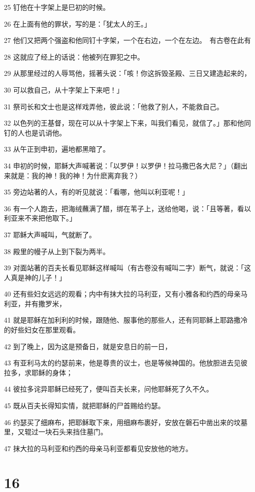 \par 25 钉他在十字架上是巳初的时候。
\par 26 在上面有他的罪状，写的是：「犹太人的王。」
\par 27 他们又把两个强盗和他同钉十字架，一个在右边，一个在左边。　有古卷在此有
\par 28 这就应了经上的话说：他被列在罪犯之中。
\par 29 从那里经过的人辱骂他，摇著头说：「咳！你这拆毁圣殿、三日又建造起来的，
\par 30 可以救自己，从十字架上下来吧！」
\par 31 祭司长和文士也是这样戏弄他，彼此说：「他救了别人，不能救自己。
\par 32 以色列的王基督，现在可以从十字架上下来，叫我们看见，就信了。」那和他同钉的人也是讥诮他。
\par 33 从午正到申初，遍地都黑暗了。
\par 34 申初的时候，耶稣大声喊著说：「以罗伊！以罗伊！拉马撒巴各大尼？」（翻出来就是：我的神！我的神！为什麽离弃我？）
\par 35 旁边站著的人，有的听见就说：「看哪，他叫以利亚呢！」
\par 36 有一个人跑去，把海绒蘸满了醋，绑在苇子上，送给他喝，说：「且等著，看以利亚来不来把他取下。」
\par 37 耶稣大声喊叫，气就断了。
\par 38 殿里的幔子从上到下裂为两半。
\par 39 对面站著的百夫长看见耶稣这样喊叫（有古卷没有喊叫二字）断气，就说：「这人真是神的儿子！」
\par 40 还有些妇女远远的观看；内中有抹大拉的马利亚，又有小雅各和约西的母亲马利亚，并有撒罗米，
\par 41 就是耶稣在加利利的时候，跟随他、服事他的那些人，还有同耶稣上耶路撒冷的好些妇女在那里观看。
\par 42 到了晚上，因为这是预备日，就是安息日的前一日，
\par 43 有亚利马太的约瑟前来，他是尊贵的议士，也是等候神国的。他放胆进去见彼拉多，求耶稣的身体；
\par 44 彼拉多诧异耶稣已经死了，便叫百夫长来，问他耶稣死了久不久。
\par 45 既从百夫长得知实情，就把耶稣的尸首赐给约瑟。
\par 46 约瑟买了细麻布，把耶稣取下来，用细麻布裹好，安放在磐石中凿出来的坟墓里，又辊过一块石头来挡住墓门。
\par 47 抹大拉的马利亚和约西的母亲马利亚都看见安放他的地方。

\chapter{16}

